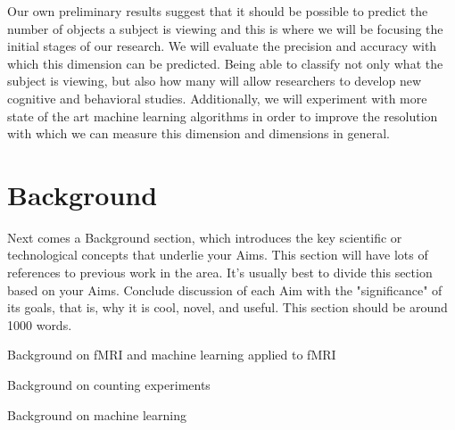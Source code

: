 \documentclass[12pt]{article}
\begin{document}
Our own preliminary results suggest that it should be possible to predict the number of objects a subject is viewing and this is where we will be focusing the initial stages of our research.
We will evaluate the precision and accuracy with which this dimension can be predicted.
Being able to classify not only what the subject is viewing, but also how many will allow researchers to develop new cognitive and behavioral studies. 
Additionally, we will experiment with more state of the art machine learning algorithms in order to improve the resolution with which we can measure this dimension and dimensions in general.

\section{Background}
Next comes a Background section, which introduces the key scientific or technological concepts that underlie your Aims. 
This section will have lots of references to previous work in the area. 
It's usually best to divide this section based on your Aims. 
Conclude discussion of each Aim with the "significance" of its goals, that is, why it is cool, novel, and useful. 
This section should be around 1000 words.

Background on fMRI and machine learning applied to fMRI

Background on counting experiments

Background on machine learning
\end{document}
